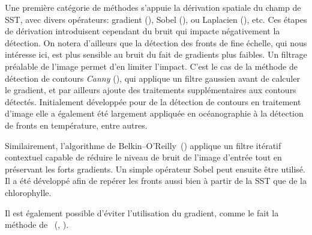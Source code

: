 Une première catégorie de méthodes s'appuie la dérivation spatiale du champ de SST, avec divers opérateurs: gradient (\cite{kazmin_1996,moore_1997,kostianoy_2004}), Sobel (\cite{sauter_1994}), ou Laplacien (\cite{holyer_1989}), etc.
Ces étapes de dérivation introduisent cependant du bruit qui impacte négativement la détection.
On notera d'ailleurs que la détection des fronts de fine échelle, qui nous intéresse ici, est plus sensible au bruit du fait de gradients plus faibles.
Un filtrage préalable de l'image permet d'en limiter l'impact.
C'est le cas de la méthode de détection de contours \emph{Canny} (\cite{canny_1986}), qui applique un filtre gaussien avant de calculer le gradient, et par ailleurs ajoute des traitements supplémentaires aux contours détectés.
Initialement développée pour de la détection de contours en traitement d'image  elle a également été largement appliquée en océanographie à la détection de fronts en température, entre autres.

Similairement, l'algorithme de Belkin--O'Reilly~(\cite{belkin_2009}) applique un filtre itératif contextuel capable de réduire le niveau de bruit de l'image d'entrée tout en préservant les forts gradients.
Un simple opérateur Sobel peut ensuite être utilisé.
Il a été développé afin de repérer les fronts aussi bien à partir de la SST que de la chlorophylle.

Il est également possible d'éviter l'utilisation du gradient, comme le fait la méthode de ~(, \cite{cayula_1992}).

